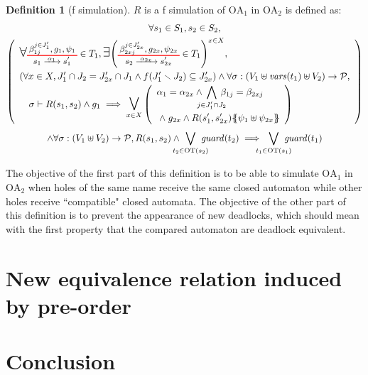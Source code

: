 \documentclass{article}
\theoremstyle{plain}
\theoremstyle{definition}
\newtheorem{defi}{Definition}
\newcommand\nmm[1]{\(\displaystyle #1\)} %
\newcommand\mpar[1]{{\left(#1\right)}}
\newcommand\mbrc[1]{{\left\{#1\right\}}}
\newcommand\psubst[1]{\mbrc{\!\!\mbrc{#1}\!\!}}
\newcommand\subbox[1]{{\makebox[.5\width]{\(\scriptstyle #1\)}}}
\newcommand\bigsymb[2][\Large]{\text{#1\nmm{#2}}} %
\newcommand\nwedge{\DOTSB\;{\wedge}\;} %
\newcommand\fvars[1]{{\mathit{vars}\mpar{#1}}}
\newcommand\values{{\mathcal{P}}}
\newcommand\OT[6]{\text{\small\(%
	\setlength\arraycolsep{2pt}\everymath{\displaystyle}%
	\renewcommand\arraystretch{1}%
	\begin{array}{c}%
	#4,#5,#6 \\\noalign{\color{red}\hrule height 1pt}
	#1\xrightarrow{\raisebox{-1.5pt}[.8\height][0pt]{\makebox[1.4\width]{\(\scriptstyle #3\)}}}#2
	\end{array}\)}}
\newcommand\OTx[4]{\OT{s_{#1}}{s'_{#1 #2}}{\alpha_{#1 #2}}{\beta_{#3 j}^{j \in J'_{#4}}}{g_{#1 #2}}{\psi_{#1 #2}}}
\begin{document}
\begin{defi}[f simulation]
\(R\) is a f simulation of \(\mathrm{OA}_1\) in \(\mathrm{OA}_2\) is defined as:
\begin{multline*}
	\forall s_1 \in S_1, s_2 \in S_2, \\
	\mpar{\renewcommand\arraystretch{1.4}\everymath{\displaystyle}\begin{array}{l}
		\bigsymb{\forall} \OTx{1}{}{1}{1} \in T_1, \bigsymb{\exists} \mpar{\OTx{2}{x}{2x}{2x} \in T_1}^{x \in X}, \\
		\mpar{\forall x \in X, J'_1 \cap J_2 = J'_{2x} \cap J_1 \wedge f\mpar{J'_1 \setminus J_2} \subseteq J'_{2x}} \wedge \forall \sigma: \mpar{V_1 \uplus \fvars{t_1} \uplus V_2} \to \values, \\
		\quad \sigma \vdash R\mpar{s_1, s_2} \wedge g_1 \implies \operatorname*{\bigsymb{\bigvee}}_{x \in X} \mpar{\begin{array}{l}
			\alpha_1 = \alpha_{2x} \wedge \bigwedge_\subbox{j \in J'_1 \cap J_2} \beta_{1j} = \beta_{2xj} \\
			\nwedge g_{2x} \wedge R\mpar{s'_1, s'_{2x}}\psubst{\psi_1 \uplus \psi_{2x}}
		\end{array}} \\
	\end{array}} \\
	\wedge \forall \sigma: \mpar{V_1 \uplus V_2} \to \values, R\mpar{s_1, s_2} \wedge \bigvee_\subbox{t_2 \in \mathrm{OT}\mpar{s_2}} \mathit{guard}\mpar{t_2} \implies \bigvee_\subbox{t_1 \in \mathrm{OT}\mpar{s_1}} \mathit{guard}\mpar{t_1}
\end{multline*}
\end{defi}
The objective of the first part of this definition is to be able to simulate \(\mathrm{OA}_1\) in \(\mathrm{OA}_2\) when holes of the same name receive the same closed automaton while other holes receive ``compatible" closed automata.
The objective of the other part of this definition is to prevent the appearance of new deadlocks, which should mean with the first property that the compared automaton are deadlock equivalent.


\section{New equivalence relation induced by pre-order}


\section{Conclusion}
\end{document}
